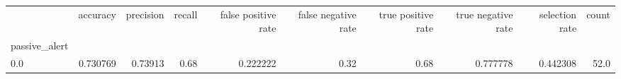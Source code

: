 \begin{tabular}{lrrrrrrrrr}
\toprule
{} &  accuracy &  precision &  recall &  false positive rate &  false negative rate &  true positive rate &  true negative rate &  selection rate &  count \\
passive\_alert &           &            &         &                      &                      &                     &                     &                 &        \\
\midrule
0.0           &  0.730769 &    0.73913 &    0.68 &             0.222222 &                 0.32 &                0.68 &            0.777778 &        0.442308 &   52.0 \\
\bottomrule
\end{tabular}
